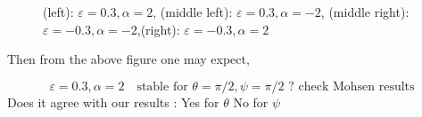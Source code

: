 \documentclass[12pt]{My_preprint}
\begin{document}
\begin{figure}
        \caption{(left): $\varepsilon = 0.3, \alpha = 2$, (middle left): $\varepsilon = 0.3, \alpha = -2$, (middle right): $\varepsilon = -0.3, \alpha = -2$,(right): $\varepsilon = -0.3, \alpha = 2$}
    \end{figure}
Then from the above figure one may expect,

\begin{equation}
\varepsilon = 0.3, \alpha = 2 \quad \text{stable for $\theta = \pi/2, \psi =\pi /2$ ? check Mohsen results}
\end{equation}
Does it agree with our results :  Yes for $\theta $ No for $\psi$ 






\appendix
\end{document}
